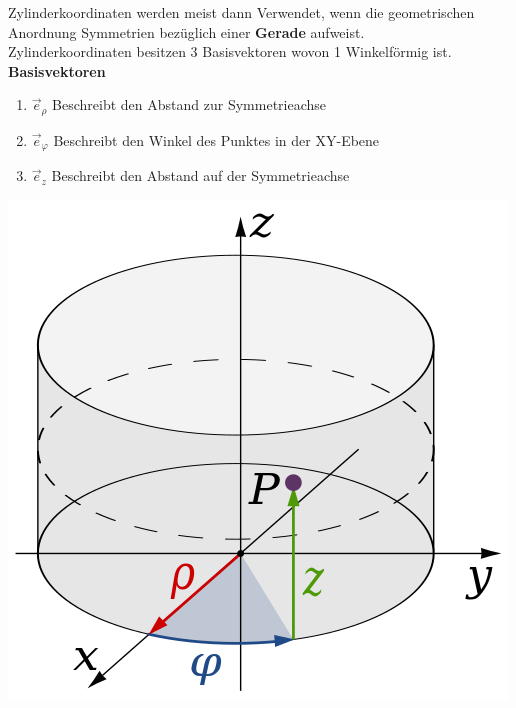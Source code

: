 {}
\beginip
Zylinderkoordinaten werden meist dann Verwendet, wenn die geometrischen Anordnung Symmetrien bezüglich einer \textbf{Gerade} aufweist. \\
Zylinderkoordinaten besitzen 3 Basisvektoren wovon 1 Winkelförmig ist. \\
\textbf{Basisvektoren}
\begin{enumerate}
	\item $\vec{e}_\rho$ Beschreibt den Abstand zur Symmetrieachse
	\item $\vec{e}_\varphi$ Beschreibt den Winkel des Punktes in der XY-Ebene
	\item $\vec{e}_z$ Beschreibt den Abstand auf der Symmetrieachse
\end{enumerate}
\begin{center}
\includegraphics[scale = 0.4]{zylinderkoord.png}
\end{center}


\iend
\newpage
{}


\beginip


